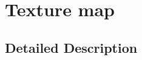\hypertarget{group____texture__map}{\section{Texture map}
\label{group____texture__map}
}


\subsection{Detailed Description}
